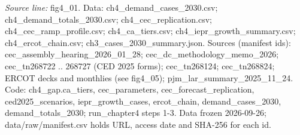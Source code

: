 {\scriptsize\textit{Source line:} fig4\_\allowbreak{}01. Data: ch4\_\allowbreak{}demand\_\allowbreak{}cases\_\allowbreak{}2030.csv; ch4\_\allowbreak{}demand\_\allowbreak{}totals\_\allowbreak{}2030.csv; ch4\_\allowbreak{}cec\_\allowbreak{}replication.csv; ch4\_\allowbreak{}cec\_\allowbreak{}ramp\_\allowbreak{}profile.csv; ch4\_\allowbreak{}ca\_\allowbreak{}tiers.csv; ch4\_\allowbreak{}iepr\_\allowbreak{}growth\_\allowbreak{}summary.csv; ch4\_\allowbreak{}ercot\_\allowbreak{}chain.csv; ch3\_\allowbreak{}cases\_\allowbreak{}2030\_\allowbreak{}summary.json. Sources (manifest ids): cec\_\allowbreak{}assembly\_\allowbreak{}hearing\_\allowbreak{}2026\_\allowbreak{}01\_\allowbreak{}28; cec\_\allowbreak{}dc\_\allowbreak{}methodology\_\allowbreak{}memo\_\allowbreak{}2026; cec\_\allowbreak{}tn268722 .. 268727 (CED 2025 forms); cec\_\allowbreak{}tn268124; cec\_\allowbreak{}tn268824; ERCOT decks and monthlies (see fig4\_\allowbreak{}05); pjm\_\allowbreak{}lar\_\allowbreak{}summary\_\allowbreak{}2025\_\allowbreak{}11\_\allowbreak{}24. Code: ch4\_\allowbreak{}gap.ca\_\allowbreak{}tiers, cec\_\allowbreak{}parameters, cec\_\allowbreak{}forecast\_\allowbreak{}replication, ced2025\_\allowbreak{}scenarios, iepr\_\allowbreak{}growth\_\allowbreak{}cases, ercot\_\allowbreak{}chain, demand\_\allowbreak{}cases\_\allowbreak{}2030, demand\_\allowbreak{}totals\_\allowbreak{}2030; run\_\allowbreak{}chapter4 steps 1-3. Data frozen 2026-09-26; data/raw/manifest.csv holds URL, access date and SHA-256 for each id.}